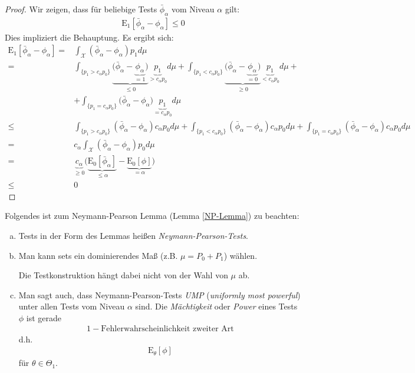 \documentclass[a4paper]{scrartcl}
\begin{document}
		\begin{proof}
			Wir zeigen, dass für beliebige Tests $\bar{\phi}_\alpha$ vom Niveau $\alpha$ gilt:
			\begin{align*}
				\mathrm{E}_1\left[\bar{\phi}_\alpha-\phi_\alpha\right]\le 0
			\end{align*}
			Dies impliziert die Behauptung. Es ergibt sich:
			\begin{align*}
				\mathrm{E}_1\left[\bar{\phi}_\alpha-\phi_\alpha\right]=&\int_\mathcal{X}\left(\bar{\phi}_\alpha-\phi_\alpha\right)p_1d\mu\\
				=&\int_{\{p_1>c_\alpha p_0\}}\underbrace{\bigg(\bar{\phi}_\alpha-\underbrace{\phi_\alpha}_{=1}\bigg)}_{\le 0}\underbrace{p_1}_{>c_\alpha p_0}d\mu+\int_{\{p_1<c_\alpha p_0\}}\underbrace{\bigg(\bar{\phi}_\alpha-\underbrace{\phi_\alpha}_{=0}\bigg)}_{\ge 0}\underbrace{p_1}_{<c_\alpha p_0}d\mu+\\
				&+\int_{\{p_1=c_\alpha p_0\}}\bigg(\bar{\phi}_\alpha-\phi_\alpha\bigg)\underbrace{p_1}_{=c_\alpha p_0}d\mu\\
				\le&\int_{\{p_1>c_\alpha p_0\}}\left(\bar{\phi}_\alpha-\phi_\alpha\right)c_\alpha p_0d\mu+\int_{\{p_1<c_\alpha p_0\}}\left(\bar{\phi}_\alpha-\phi_\alpha\right)c_\alpha p_0d\mu+\int_{\{p_1=c_\alpha p_0\}}\left(\bar{\phi}_\alpha-\phi_\alpha\right)c_\alpha p_0d\mu\\
				=&c_\alpha\int_\mathcal{X}\left(\bar{\phi}_\alpha-\phi_\alpha\right)p_0d\mu\\
				=&\underbrace{c_\alpha}_{\ge 0}\bigg(\underbrace{\mathrm{E}_0\left[\bar{\phi}_\alpha\right]}_{\le\alpha}-\underbrace{\mathrm{E}_0[\phi]}_{=\alpha}\bigg)\\
				\le&0
			\end{align*}
		\end{proof}
		\begin{remark}
			Folgendes ist zum Neymann-Pearson Lemma (Lemma \ref{NP-Lemma}) zu beachten:
			\begin{enumerate}[a)]
				\item Tests in der Form des Lemmas heißen \emph{Neymann-Pearson-Tests}.
				\item Man kann sets ein dominierendes Maß (z.B. $\mu=P_0+P_1$) wählen.
				
				Die Testkonstruktion hängt dabei nicht von der Wahl von $\mu$ ab.
				\item Man sagt auch, dass Neymann-Pearson-Tests \emph{UMP} (\emph{uniformly most powerful}) unter allen Tests vom Niveau $\alpha$ sind. Die \emph{Mächtigkeit} oder \emph{Power} eines Tests $\phi$ ist gerade
				\begin{align*}
					1-\text{Fehlerwahrscheinlichkeit zweiter Art}
				\end{align*}
				d.h.
				\begin{align*}
					\mathrm{E}_\theta[\phi]
				\end{align*}
				für $\theta\in\Theta_1$.
			\end{enumerate}
		\end{remark}
\end{document}

